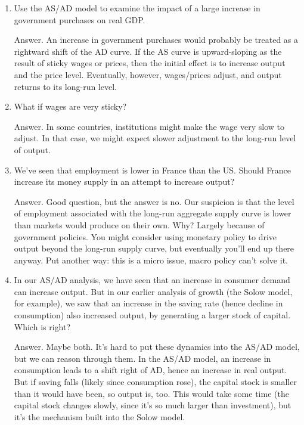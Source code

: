 \documentclass[letterpaper,12pt]{article}
\begin{document}
\begin{enumerate}

\item  Use the AS/AD model to examine the impact of 
a large increase in government purchases on real GDP.  

Answer.  
An increase in government purchases would probably be treated 
as a rightward shift of the AD curve.  
If the AS curve is upward-sloping as the result of 
sticky wages or prices, 
then the initial effect is to increase output and the price level.
Eventually, however, wages/prices adjust, 
and output returns to its long-run level.  

\item What if wages are very sticky?  

Answer.  In some countries, institutions might make the wage very slow to adjust.  
In that case, we might expect slower adjustment to the long-run 
level of output.

\item We've seen that employment is lower in France than the US. 
Should France increase its money supply in an attempt to increase 
output?  

Answer.  Good question, but the answer is no.  
Our suspicion is that the level of employment 
associated with the long-run aggregate supply curve is lower than 
markets would produce on their own. 
Why?  Largely because of government policies.
You might consider using monetary policy to drive output beyond the 
long-run supply curve, but eventually you'll end up there anyway.
Put another way:  this is a micro issue, macro policy can't solve it. 


\item In our AS/AD analysis, we have seen that an increase in 
consumer demand can increase output.
But in our earlier analysis of growth (the Solow model, for example), 
we saw that an increase in the saving rate (hence decline in consumption) 
also increased output, by generating a larger stock of capital.  
Which is right?  

Answer.  Maybe both.  It's hard to put these dynamics into the 
AS/AD model, but we can reason through them.  
In the AS/AD model, an increase in consumption leads to 
a shift right of AD, hence an increase in real output.
But if saving falls (likely since consumption rose), 
the capital stock is smaller than it would have been, 
so output is, too.
This would take some time (the capital stock changes slowly, 
since it's so much larger than investment), but it's the mechanism
built into the Solow model. 



\end{enumerate}
\end{document}
